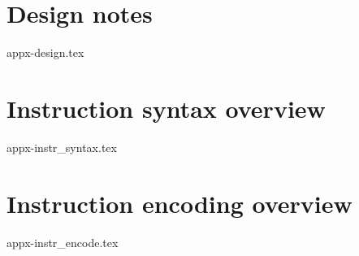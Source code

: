 \documentclass{article}
\begin{document}
\clearpage
\section{Design notes}
\label{appx:design}

{appx-design.tex}

\clearpage
\section{Instruction syntax   overview}
\label{appx:instr_syntax}

{appx-instr_syntax.tex}

\clearpage
\section{Instruction encoding overview} 
\label{appx:instr_encode}

{appx-instr_encode.tex}

\end{document}
